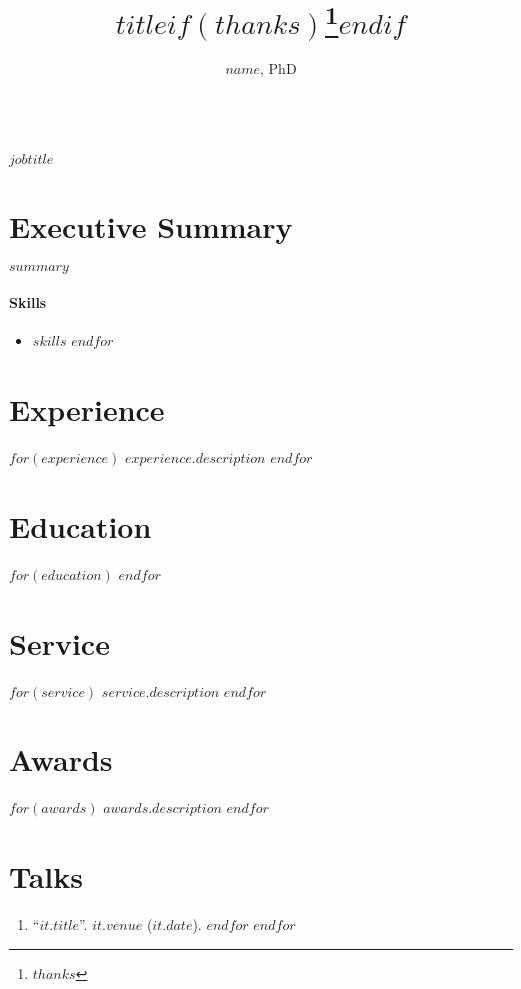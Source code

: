 \documentclass[11pt]{article}
\title{$title$$if(thanks)$\thanks{$thanks$}$endif$}
\author{$name$, PhD}
\date{}
\makeatletter
\renewcommand\maketitle{
    {\noindent\Large\sffamily\bfseries \@author\\
		\large\normalfont\itshape $jobtitle$}
  }
\makeatother
\begin{document}
\maketitle
\thispagestyle{empty}

\section{Executive Summary}
\noindent $summary$
\paragraph{Skills} \begin{multicols}{3}
	\begin{itemize}
		$for(skills)$
		\item $skills$
		$endfor$
	\end{itemize}
\end{multicols}
\titlerule

\section*{Experience}
$for(experience)$
$experience.description$
$endfor$

\section*{Education}
$for(education)$
$endfor$

\section*{Service}
$for(service)$
$service.description$
$endfor$

\section*{Awards}
$for(awards)$
$awards.description$
$endfor$

\section*{Talks}
\begin{enumerate}
$for(talks)$
$for(talks.entries)$
\item ``\href{$it.link$}{$it.title$}''. $it.venue$ ($it.date$).
$endfor$
$endfor$
\end{enumerate}
\end{document}
